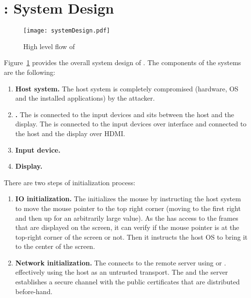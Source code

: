 \section{\name: System Design}
\label{sec:systemDesign}


\begin{figure}[t]
\centering
\texttt{[image: systemDesign.pdf]}
\caption{High level flow of \name}
\label{fig:systemDesign}
\centering
\end{figure}



Figure~\ref{fig:systemDesign} provides the overall system design of \name. The components of the systems are the following:

\begin{enumerate}
  \item \textbf{Host system.} The host system is completely compromised (hardware, OS and the installed applications) by the attacker.
  \item \textbf{\device.} The \device is connected to the input devices and sits between the host and the display. The \device is connected to the input devices over \usb interface and connected to the host and the display over HDMI.
  \item \textbf{Input device.}
  \item \textbf{Display.}
  
\end{enumerate}

There are two steps of initialization process:

\begin{enumerate}
  \item\textbf{IO initialization.} The \device initializes the mouse by instructing the host system to move the mouse pointer to the top right corner (moving to the first right and then up for an arbitrarily large value). As the \device has access to the frames that are displayed on the screen, it can verify if the mouse pointer is at the top-right corner of the screen or not. Then it instructs the host OS to bring it to the center of the screen.
  
  \item\textbf{Network initialization.} The \device connects to the remote server using \webusb or \webbt. effectively using the host as an untrusted transport. The \device and the server establishes a secure channel with the public certificates that are distributed before-hand.
\end{enumerate}

